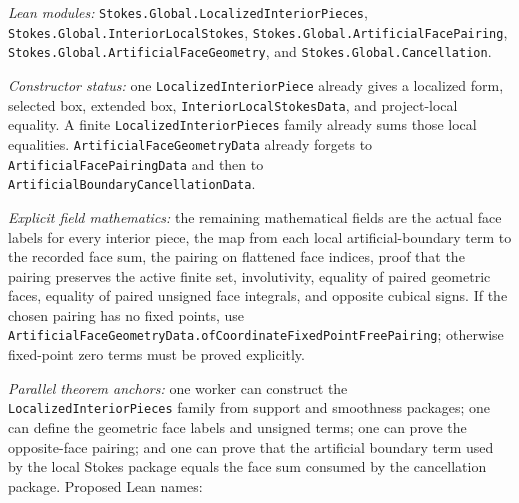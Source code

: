 \begin{definition}
  \label{anc:m6_4_interior_pieces_artificial_faces}
  \leanok
  \emph{Lean modules:}
  \texttt{Stokes.Global.LocalizedInteriorPieces},
  \texttt{Stokes.Global.InteriorLocalStokes},
  \texttt{Stokes.Global.ArtificialFacePairing},
  \texttt{Stokes.Global.ArtificialFaceGeometry}, and
  \texttt{Stokes.Global.Cancellation}.

  \emph{Constructor status:}
  one \texttt{LocalizedInteriorPiece} already gives a localized form, selected
  box, extended box, \texttt{InteriorLocalStokesData}, and project-local
  equality.  A finite \texttt{LocalizedInteriorPieces} family already sums
  those local equalities.  \texttt{ArtificialFaceGeometryData} already forgets
  to \texttt{ArtificialFacePairingData} and then to
  \texttt{ArtificialBoundaryCancellationData}.

  \emph{Explicit field mathematics:}
  the remaining mathematical fields are the actual face labels for every
  interior piece, the map from each local artificial-boundary term to the
  recorded face sum, the pairing on flattened face indices, proof that the
  pairing preserves the active finite set, involutivity, equality of paired
  geometric faces, equality of paired unsigned face integrals, and opposite
  cubical signs.  If the chosen pairing has no fixed points, use
  \texttt{ArtificialFaceGeometryData.ofCoordinateFixedPointFreePairing};
  otherwise fixed-point zero terms must be proved explicitly.

  \emph{Parallel theorem anchors:}
  one worker can construct the \texttt{LocalizedInteriorPieces} family from
  support and smoothness packages; one can define the geometric face labels and
  unsigned terms; one can prove the opposite-face pairing; and one can prove
  that the artificial boundary term used by the local Stokes package equals
  the face sum consumed by the cancellation package.  Proposed Lean names:
\end{definition}

